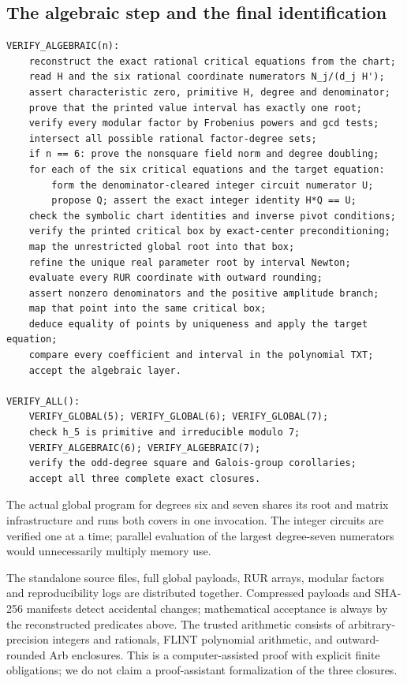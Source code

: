 \documentclass[11pt]{article}
\begin{document}
\begin{samepage}
\subsection{The algebraic step and the final identification}
\begin{Verbatim}
VERIFY_ALGEBRAIC(n):
    reconstruct the exact rational critical equations from the chart;
    read H and the six rational coordinate numerators N_j/(d_j H');
    assert characteristic zero, primitive H, degree and denominator;
    prove that the printed value interval has exactly one root;
    verify every modular factor by Frobenius powers and gcd tests;
    intersect all possible rational factor-degree sets;
    if n == 6: prove the nonsquare field norm and degree doubling;
    for each of the six critical equations and the target equation:
        form the denominator-cleared integer circuit numerator U;
        propose Q; assert the exact integer identity H*Q == U;
    check the symbolic chart identities and inverse pivot conditions;
    verify the printed critical box by exact-center preconditioning;
    map the unrestricted global root into that box;
    refine the unique real parameter root by interval Newton;
    evaluate every RUR coordinate with outward rounding;
    assert nonzero denominators and the positive amplitude branch;
    map that point into the same critical box;
    deduce equality of points by uniqueness and apply the target equation;
    compare every coefficient and interval in the polynomial TXT;
    accept the algebraic layer.

VERIFY_ALL():
    VERIFY_GLOBAL(5); VERIFY_GLOBAL(6); VERIFY_GLOBAL(7);
    check h_5 is primitive and irreducible modulo 7;
    VERIFY_ALGEBRAIC(6); VERIFY_ALGEBRAIC(7);
    verify the odd-degree square and Galois-group corollaries;
    accept all three complete exact closures.
\end{Verbatim}
\end{samepage}
The actual global program for degrees six and seven shares its root and
matrix infrastructure and runs both covers in one invocation. The
integer circuits are verified one at a time; parallel evaluation of the
largest degree-seven numerators would unnecessarily multiply memory use.

The standalone source files, full global payloads, RUR arrays, modular
factors and reproducibility logs are distributed together. Compressed
payloads and SHA-256 manifests detect accidental changes; mathematical
acceptance is always by the reconstructed predicates above. The trusted
arithmetic consists of arbitrary-precision integers and rationals,
FLINT polynomial arithmetic, and outward-rounded Arb enclosures.
This is a computer-assisted proof with explicit finite obligations;
we do not claim a proof-assistant formalization of the three closures.
\end{document}
